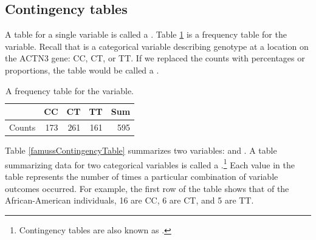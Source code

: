 \begin{doublespace}
\subsection{Contingency tables}
A table for a single variable is called a . Table \ref{famussFrequencyTable} is a frequency table for the  variable. Recall that  is a categorical variable describing genotype at a location on the ACTN3 gene: CC, CT, or TT. If we replaced the counts with percentages or proportions, the table would be called a .

\begin{table}[ht]
	\centering
	\begin{tabular}{rrrrr}
		\hline
		& CC & CT & TT & Sum \\ 
		\hline
		Counts & 173 & 261 & 161 & 595 \\ 
		\hline
	\end{tabular}
	\caption{A frequency table for the  variable.} 
	\label{famussFrequencyTable}
\end{table}

Table \ref{famussContingencyTable} summarizes two variables:  and . A table summarizing data for two categorical variables is called a .\footnote{Contingency tables are also known as .} Each value in the table represents the number of times a particular combination of variable outcomes occurred. For example, the first row of the table shows that of the African-American individuals, 16 are CC, 6 are CT, and 5 are TT. 


\end{doublespace}
